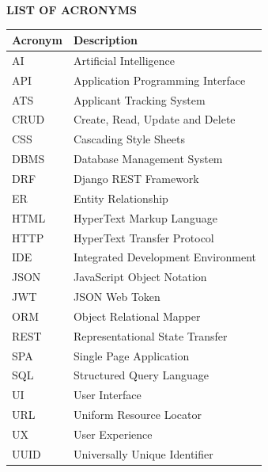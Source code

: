 \thispagestyle{plain}

\begin{center}
{\Large\bfseries\uppercase{List of Acronyms}}
\end{center}

\vspace{0.8cm}

\renewcommand{\arraystretch}{1.4}

\begin{center}
\begin{tabular}{|>{\centering\arraybackslash}m{2.8cm}|m{10.8cm}|}
\hline
\textbf{Acronym} & \textbf{Description} \\
\hline
AI & Artificial Intelligence \\ \hline
API & Application Programming Interface \\ \hline
ATS & Applicant Tracking System \\ \hline
CRUD & Create, Read, Update and Delete \\ \hline
CSS & Cascading Style Sheets \\ \hline
DBMS & Database Management System \\ \hline
DRF & Django REST Framework \\ \hline
ER & Entity Relationship \\ \hline
HTML & HyperText Markup Language \\ \hline
HTTP & HyperText Transfer Protocol \\ \hline
IDE & Integrated Development Environment \\ \hline
JSON & JavaScript Object Notation \\ \hline
JWT & JSON Web Token \\ \hline
ORM & Object Relational Mapper \\ \hline
REST & Representational State Transfer \\ \hline
SPA & Single Page Application \\ \hline
SQL & Structured Query Language \\ \hline
UI & User Interface \\ \hline
URL & Uniform Resource Locator \\ \hline
UX & User Experience \\ \hline
UUID & Universally Unique Identifier \\ \hline
\end{tabular}
\end{center}

\renewcommand{\arraystretch}{1}

\newpage